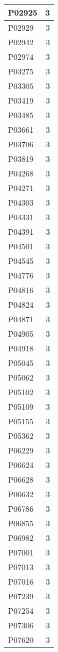 \documentclass[
]{book}
\theoremstyle{definition}
\theoremstyle{definition}
\theoremstyle{definition}
\theoremstyle{definition}
\theoremstyle{remark}
\begin{document}
\begin{table}
\begin{tabular}{l|r}
\hline
P02925 & 3\\
\hline
P02929 & 3\\
\hline
P02942 & 3\\
\hline
P02974 & 3\\
\hline
P03275 & 3\\
\hline
P03305 & 3\\
\hline
P03419 & 3\\
\hline
P03485 & 3\\
\hline
P03661 & 3\\
\hline
P03706 & 3\\
\hline
P03819 & 3\\
\hline
P04268 & 3\\
\hline
P04271 & 3\\
\hline
P04303 & 3\\
\hline
P04331 & 3\\
\hline
P04391 & 3\\
\hline
P04501 & 3\\
\hline
P04545 & 3\\
\hline
P04776 & 3\\
\hline
P04816 & 3\\
\hline
P04824 & 3\\
\hline
P04871 & 3\\
\hline
P04905 & 3\\
\hline
P04918 & 3\\
\hline
P05045 & 3\\
\hline
P05062 & 3\\
\hline
P05102 & 3\\
\hline
P05109 & 3\\
\hline
P05155 & 3\\
\hline
P05362 & 3\\
\hline
P06229 & 3\\
\hline
P06624 & 3\\
\hline
P06628 & 3\\
\hline
P06632 & 3\\
\hline
P06786 & 3\\
\hline
P06855 & 3\\
\hline
P06982 & 3\\
\hline
P07001 & 3\\
\hline
P07013 & 3\\
\hline
P07016 & 3\\
\hline
P07239 & 3\\
\hline
P07254 & 3\\
\hline
P07306 & 3\\
\hline
P07620 & 3\\

\end{tabular}
\end{table}
\end{document}
